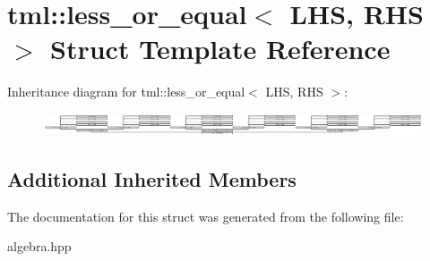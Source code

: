 \hypertarget{structtml_1_1less__or__equal}{\section{tml\+:\+:less\+\_\+or\+\_\+equal$<$ L\+H\+S, R\+H\+S $>$ Struct Template Reference}
\label{structtml_1_1less__or__equal}
}
Inheritance diagram for tml\+:\+:less\+\_\+or\+\_\+equal$<$ L\+H\+S, R\+H\+S $>$\+:\begin{figure}[H]
\begin{center}
\leavevmode
\includegraphics[height=0.662610cm]{structtml_1_1less__or__equal}
\end{center}
\end{figure}
\subsection*{Additional Inherited Members}


The documentation for this struct was generated from the following file\+:\begin{DoxyCompactItemize}
\item 
algebra.\+hpp\end{DoxyCompactItemize}
